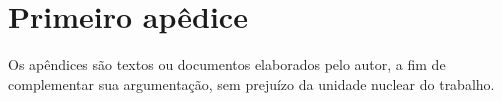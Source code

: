 \apendice
\chapter{Primeiro apêdice}

Os apêndices são textos ou documentos elaborados pelo autor, a fim de complementar sua argumentação, sem prejuízo da unidade nuclear do trabalho.
